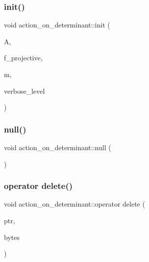 \mbox{\label{classaction__on__determinant_a2fea52d41ce31ebca3ff12758c37fe6d}} 
\subsubsection{\texorpdfstring{init()}{init()}}
{\footnotesize\ttfamily void action\+\_\+on\+\_\+determinant\+::init (\begin{DoxyParamCaption}\item[{\mbox{\hyperlink{classaction}{action}} \&}]{A,  }\item[{\mbox{\hyperlink{galois_8h_a09fddde158a3a20bd2dcadb609de11dc}{I\+NT}}}]{f\+\_\+projective,  }\item[{\mbox{\hyperlink{galois_8h_a09fddde158a3a20bd2dcadb609de11dc}{I\+NT}}}]{m,  }\item[{\mbox{\hyperlink{galois_8h_a09fddde158a3a20bd2dcadb609de11dc}{I\+NT}}}]{verbose\+\_\+level }\end{DoxyParamCaption})}

\mbox{\label{classaction__on__determinant_a618fbf430ffebd648cd1a2d397bfc195}} 
\subsubsection{\texorpdfstring{null()}{null()}}
{\footnotesize\ttfamily void action\+\_\+on\+\_\+determinant\+::null (\begin{DoxyParamCaption}{ }\end{DoxyParamCaption})}

\mbox{\label{classaction__on__determinant_a66b6cfe03050edc6b2ba286322aa0573}} 
\subsubsection{\texorpdfstring{operator delete()}{operator delete()}}
{\footnotesize\ttfamily void action\+\_\+on\+\_\+determinant\+::operator delete (\begin{DoxyParamCaption}\item[{void $\ast$}]{ptr,  }\item[{size\+\_\+t}]{bytes }\end{DoxyParamCaption})}

